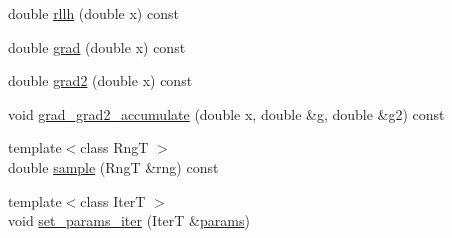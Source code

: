 \begin{DoxyCompactItemize}
\item 
double \hyperlink{classprior__hessian_1_1ParetoDist_a609ed75305325062ebd80dcfaa487c69}{rllh} (double x) const 
\item 
double \hyperlink{classprior__hessian_1_1ParetoDist_a3f802550dfcad6f0e3a8ca2e93709fe9}{grad} (double x) const 
\item 
double \hyperlink{classprior__hessian_1_1ParetoDist_a24a4aaa7a8edb42009d0fa8390cb4a8f}{grad2} (double x) const 
\item 
void \hyperlink{classprior__hessian_1_1ParetoDist_a20c3f90ec9ac4b5bfd179a7c97ab36e7}{grad\+\_\+grad2\+\_\+accumulate} (double x, double \&g, double \&g2) const 
\item 
{\footnotesize template$<$class RngT $>$ }\\double \hyperlink{classprior__hessian_1_1ParetoDist_abe706f0786b5e8ef20b7caff07ffad0c}{sample} (RngT \&rng) const 
\item 
{\footnotesize template$<$class IterT $>$ }\\void \hyperlink{classprior__hessian_1_1ParetoDist_abc9e60af487bda1a9ec5f7e55e38682c}{set\+\_\+params\+\_\+iter} (IterT \&\hyperlink{classprior__hessian_1_1ParetoDist_af5791e2cef16b34e1bbdeec24b13d22e}{params})
\end{DoxyCompactItemize}
